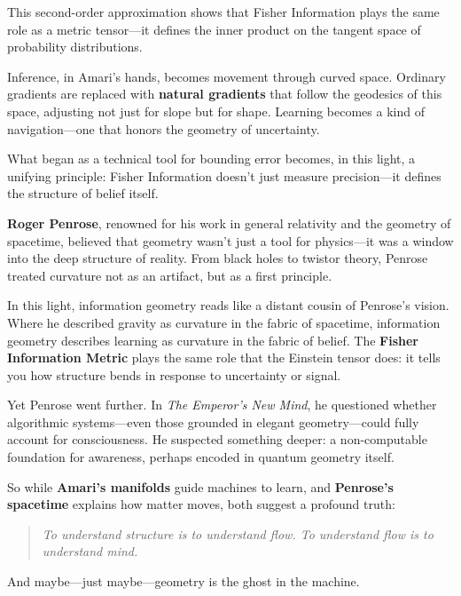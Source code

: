 This second-order approximation shows that Fisher Information plays the same role as a metric tensor—it defines the inner product on the tangent space of probability distributions.

Inference, in Amari’s hands, becomes movement through curved space. Ordinary gradients are replaced with \textbf{natural gradients} that follow the geodesics of this space, adjusting not just for slope but for shape. Learning becomes a kind of navigation—one that honors the geometry of uncertainty.

What began as a technical tool for bounding error becomes, in this light, a unifying principle:  
Fisher Information doesn’t just measure precision—it defines the structure of belief itself.

\begin{tcolorbox}[colback=purple!5!white, colframe=purple!60!black, title=Penrose and the Shape of Thought]

    \textbf{Roger Penrose}, renowned for his work in general relativity and the geometry of spacetime, believed that geometry wasn't just a tool for physics—it was a window into the deep structure of reality. From black holes to twistor theory, Penrose treated curvature not as an artifact, but as a first principle.
    
    In this light, information geometry reads like a distant cousin of Penrose’s vision. Where he described gravity as curvature in the fabric of spacetime, information geometry describes learning as curvature in the fabric of belief. The \textbf{Fisher Information Metric} plays the same role that the Einstein tensor does: it tells you how structure bends in response to uncertainty or signal.
    
    Yet Penrose went further. In \textit{The Emperor’s New Mind}, he questioned whether algorithmic systems—even those grounded in elegant geometry—could fully account for consciousness. He suspected something deeper: a non-computable foundation for awareness, perhaps encoded in quantum geometry itself.
    
    So while \textbf{Amari’s manifolds} guide machines to learn, and \textbf{Penrose’s spacetime} explains how matter moves, both suggest a profound truth:
    
    \begin{quote}
    \emph{To understand structure is to understand flow. To understand flow is to understand mind.}
    \end{quote}
    
    And maybe—just maybe—geometry is the ghost in the machine.
\end{tcolorbox}
